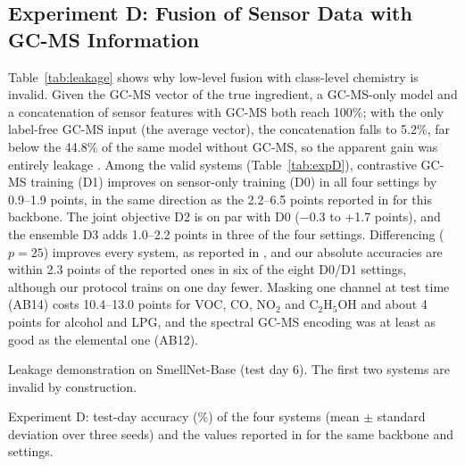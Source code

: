\documentclass[12pt]{article}
\begin{document}
\subsection{Experiment D: Fusion of Sensor Data with GC-MS Information}
\label{sec:expD}

Table~\ref{tab:leakage} shows why low-level fusion with class-level chemistry is invalid. Given the GC-MS vector of the true ingredient, a GC-MS-only model and a concatenation of sensor features with GC-MS both reach 100\%; with the only label-free GC-MS input (the average vector), the concatenation falls to 5.2\%, far below the 44.8\% of the same model without GC-MS, so the apparent gain was entirely leakage \cite{kaufman2012leakage}. Among the valid systems (Table~\ref{tab:expD}), contrastive GC-MS training (D1) improves on sensor-only training (D0) in all four settings by 0.9--1.9 points, in the same direction as the 2.2--6.5 points reported in \cite{feng2026smellnet} for this backbone. The joint objective D2 is on par with D0 ($-$0.3 to +1.7 points), and the ensemble D3 adds 1.0--2.2 points in three of the four settings. Differencing ($p = 25$) improves every system, as reported in \cite{feng2026smellnet}, and our absolute accuracies are within 2.3 points of the reported ones in six of the eight D0/D1 settings, although our protocol trains on one day fewer. Masking one channel at test time (AB14) costs 10.4--13.0 points for VOC, CO, NO$_2$ and C$_2$H$_5$OH and about 4 points for alcohol and LPG, and the spectral GC-MS encoding was at least as good as the elemental one (AB12).

\begin{table}[!htbp]
\centering
\caption[Leakage demonstration on SmellNet-Base]{Leakage demonstration on SmellNet-Base (test day 6). The first two systems are invalid by construction.}
\label{tab:leakage}
\footnotesize

\end{table}

\begin{table}[!htbp]
\centering
\caption[Experiment D: test-day accuracy of the four systems]{Experiment D: test-day accuracy (\%) of the four systems (mean $\pm$ standard deviation over three seeds) and the values reported in \cite{feng2026smellnet} for the same backbone and settings.}
\label{tab:expD}
\footnotesize
\begin{adjustbox}{max width=\textwidth}

\end{adjustbox}
\end{table}
\end{document}
